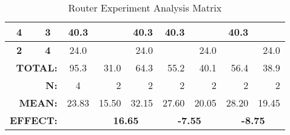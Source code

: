 \begin{sidewaystable}[]
\begin{tabular}{|c|l|c|l|c|l|r|r|r|r|r|r|}
\multicolumn{2}{|c|}{\textbf{4}}                                                     & \multicolumn{2}{c|}{\textbf{3}}                                                   & \multicolumn{2}{c|}{40.3}                                                    & \cellcolor[HTML]{000000}        & 40.3                                            & 40.3                            & \cellcolor[HTML]{000000}        & 40.3                            & \cellcolor[HTML]{000000}        \\ \hline
\multicolumn{2}{|c|}{\textbf{2}}                                                     & \multicolumn{2}{c|}{\textbf{4}}                                                   & \multicolumn{2}{c|}{24.0}                                                    & \cellcolor[HTML]{000000}        & 24.0                                            & \cellcolor[HTML]{000000}        & 24.0                            & \cellcolor[HTML]{000000}        & 24.0                            \\ \hline
\multicolumn{4}{|r|}{\textbf{TOTAL:}}                                                                                                                                    & \multicolumn{2}{c|}{95.3}                                                    & 31.0                            & 64.3                                            & 55.2                            & 40.1                            & 56.4                            & 38.9                            \\ \hline
\multicolumn{4}{|r|}{\textbf{N:}}                                                                                                                                        & \multicolumn{2}{c|}{4}                                                       & 2                               & 2                                               & 2                               & 2                               & 2                               & 2                               \\ \hline
\multicolumn{4}{|r|}{\textbf{MEAN:}}                                                                                                                                     & \multicolumn{2}{c|}{23.83}                                                   & 15.50                           & 32.15                                           & 27.60                           & 20.05                           & 28.20                           & 19.45                           \\ \hline
\multicolumn{4}{|r|}{\textbf{EFFECT:}}                                                                                                                                   & \multicolumn{2}{l|}{\cellcolor[HTML]{000000}}                                & \multicolumn{2}{c|}{\textbf{16.65}}                                               & \multicolumn{2}{c|}{\textbf{-7.55}}                               & \multicolumn{2}{c|}{\textbf{-8.75}}                               \\ \hline
\end{tabular}\caption{Router Experiment Analysis Matrix}\label{Filled_2fac2lev}
\end{sidewaystable}